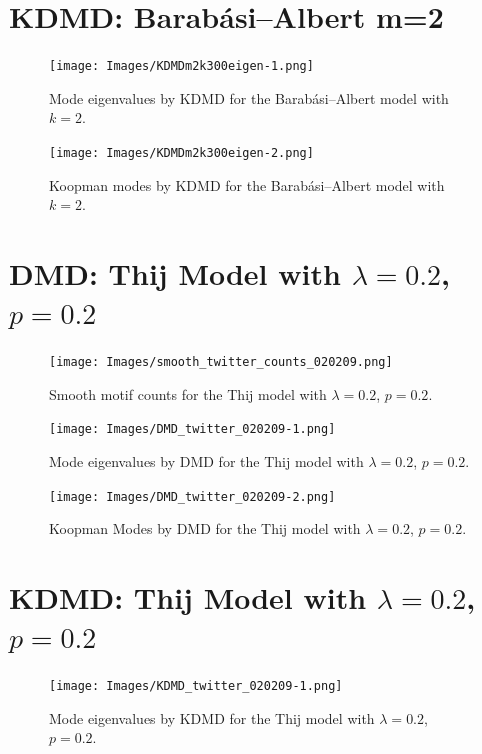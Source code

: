 \section{KDMD: Barabási–Albert m=2}

\begin{figure}
    \texttt{[image: Images/KDMDm2k300eigen-1.png]}
    \centering
    \caption{Mode eigenvalues by KDMD for the Barabási–Albert model
    with $k=2$.}
\end{figure}

\begin{figure}
    \texttt{[image: Images/KDMDm2k300eigen-2.png]}
    \centering
    \caption{Koopman modes by KDMD for the Barabási–Albert model
    with $k=2$.}
\end{figure}

\clearpage

\section{DMD: Thij Model with $\lambda=0.2$, $p=0.2$}
\begin{figure}
    \texttt{[image: Images/smooth\_twitter\_counts\_020209.png]}
    \centering
    \caption{Smooth motif counts for the Thij model
    with $\lambda=0.2$, $p=0.2$.}
    \label{fig:pthij0202}
\end{figure}

\clearpage

\begin{figure}
    \texttt{[image: Images/DMD\_twitter\_020209-1.png]}
    \centering
    \caption{Mode eigenvalues by DMD for the Thij model
    with $\lambda=0.2$, $p=0.2$.}
\end{figure}

\begin{figure}
    \texttt{[image: Images/DMD\_twitter\_020209-2.png]}
    \centering
    \caption{Koopman Modes by DMD for the Thij model
    with $\lambda=0.2$, $p=0.2$.}
\end{figure}

\clearpage

\section{KDMD: Thij Model with $\lambda=0.2$, $p=0.2$}

\FloatBarrier


\begin{figure}
    \texttt{[image: Images/KDMD\_twitter\_020209-1.png]}
    \centering
    \caption{Mode eigenvalues by KDMD for the Thij model
    with $\lambda=0.2$, $p=0.2$.}
\end{figure}

